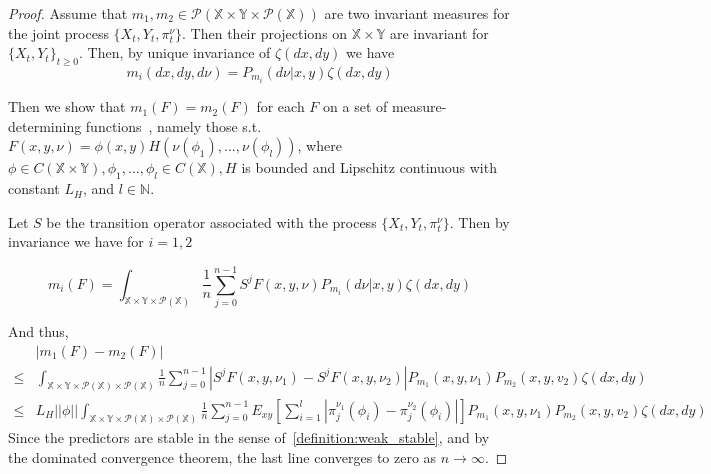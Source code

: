 \documentclass{article}
\begin{document}
\begin{proof}
    Assume that \( m_1,m_2 \in \mathcal{P}(\mathbb{X} \times \mathbb{Y} \times \mathcal{P}(\mathbb{X})) \) are two invariant measures for the joint process \( \{X_t,Y_t,\pi_t^\nu \} \). Then their projections on \( \mathbb{X} \times \mathbb{Y} \) are invariant for \( \{X_t, Y_t\}_{t\ge0} \). Then, by unique invariance of \( \zeta(dx,dy) \) we have
    \[ m_i(dx,dy,d\nu) = P_{m_i}(d\nu | x,y)\zeta(dx,dy) \]

    Then we show that \( m_1(F) = m_2(F) \) for each \( F \) on a set of measure-determining functions~\cite{Stettner}, namely those s.t. \( F(x,y,\nu) = \phi(x,y)H(\nu(\phi_1),\ldots,\nu(\phi_l)) \), where \( \phi \in C(\mathbb{X} \times \mathbb{Y}), \phi_1,\ldots,\phi_l \in C(\mathbb{X}), H \) is bounded and Lipschitz continuous with constant \( L_H \), and \( l \in \mathbb{N} \).

    Let \( S \) be the transition operator associated with the process \( \{X_t,Y_t,\pi_t^\nu \} \). Then by invariance we have for \( i=1,2 \)

    \[ m_i(F) =  \int_{\mathbb{X} \times \mathbb{Y} \times \mathcal{P}(\mathbb{X})} \frac{1}{n}\sum_{j=0}^{n-1}S^j F(x,y,\nu)P_{m_i}(d\nu | x,y)\zeta(dx,dy) \]

    And thus,
    \begin{align*}
            & |m_1(F) - m_2(F)|                                                                                                                                                                                                                                             \\
        \le & \int_{\mathbb{X} \times \mathbb{Y} \times \mathcal{P}(\mathbb{X}) \times \mathcal{P}(\mathbb{X})} \frac{1}{n}\sum_{j=0}^{n-1} |S^j F(x,y,\nu_1) - S^j F(x,y,\nu_2)|P_{m_1}(x,y,\nu_1)P_{m_2}(x,y,v_2)\zeta(dx,dy)                                             \\
        \le & L_H ||\phi|| \int_{\mathbb{X} \times \mathbb{Y} \times \mathcal{P}(\mathbb{X}) \times \mathcal{P}(\mathbb{X})} \frac{1}{n}\sum_{j=0}^{n-1}E_{xy}[\sum_{i=1}^{l}|\pi_j^{\nu_1}(\phi_i) - \pi_j^{\nu_2}(\phi_i)|]P_{m_1}(x,y,\nu_1)P_{m_2}(x,y,v_2)\zeta(dx,dy)
    \end{align*}
    Since the predictors are stable in the sense of~\ref{definition:weak_stable}, and by the dominated convergence theorem, the last line converges to zero as \( n \to \infty \).
\end{proof}
\end{document}

